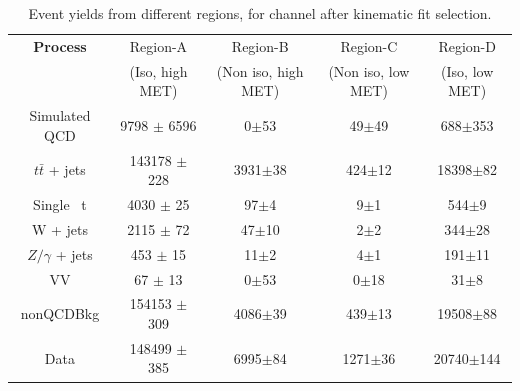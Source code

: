 \begin{table}
\caption{Event yields from different regions, for \ejets channel after kinematic fit selection.}
\label{tab:qcdABCD_ele}
\centering
\begin{adjustbox}{max width=\textwidth}
\begin{tabular}{ccccc}
\hline 
\hline 
\bf{Process} & Region-A & Region-B & Region-C & Region-D  \\ 
 & (Iso, high MET) & (Non iso, high MET) & (Non iso, low MET)& (Iso, low MET) \\ 
\hline 
\hline 
Simulated QCD & 9798 $\pm$ 6596 & 0$\pm$53 & 49$\pm$49 & 688$\pm$353 \\ 
\hline 
$t\bar{t}$ + jets & 143178 $\pm$ 228 & 3931$\pm$38 & 424$\pm$12 & 18398$\pm$82 \\ 
Single ~t & 4030 $\pm$ 25 & 97$\pm$4 & 9$\pm$1 & 544$\pm$9 \\ 
 W + jets & 2115 $\pm$ 72 & 47$\pm$10 & 2$\pm$2 & 344$\pm$28 \\ 
$Z/\gamma$ + jets & 453 $\pm$ 15 & 11$\pm$2 & 4$\pm$1 & 191$\pm$11 \\ 
VV & 67 $\pm$ 13 & 0$\pm$53 & 0$\pm$18 & 31$\pm$8 \\ 
\hline 
nonQCDBkg & 154153 $\pm$ 309 & 4086$\pm$39 & 439$\pm$13 & 19508$\pm$88 \\ 
\hline 
Data & 148499 $\pm$ 385 & 6995$\pm$84 & 1271$\pm$36 & 20740$\pm$144 \\ 
\hline 
\end{tabular}
\end{adjustbox}
\end{table}

